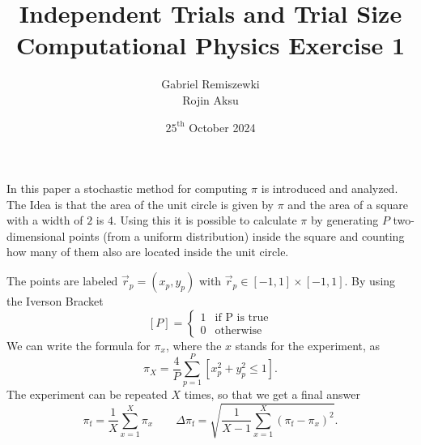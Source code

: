 \documentclass{article}
\author{Gabriel Remiszewki \\ Rojin Aksu}
\date{$25^{\mathrm{th}}$ October 2024}
\title{Independent Trials and Trial Size \\ \large Computational Physics Exercise 1}
\begin{document}
    \maketitle

    In this paper a stochastic method for computing $\pi$ is introduced and analyzed.
    The Idea is that the area of the unit circle is given by $\pi$ and the area of a square 
    with a width of $2$ is $4$. Using this it is possible to calculate $\pi$ by generating 
    $P$ two-dimensional points (from a uniform distribution) inside the square and counting how many of them also 
    are located inside the unit circle.\par
    The points are labeled $\vec r_p = (x_p, y_p)$ with $\vec r_p \in [-1, 1]\times [-1 ,1]$.
    By using the Iverson Bracket 
    \[
        [P] = \begin{cases}
           1 & \text{if P is true}\\
           0 & \mathrm{otherwise} 
        \end{cases}
    \]
    We can write the formula for $\pi_x$, where the $x$ stands for the experiment, as 
    \begin{equation}
        \pi_X = \frac{4}{P}\sum_{p = 1}^P [x_p^2 + y_p^2 \leq 1].
        \label{eq:pi} 
    \end{equation}
    The experiment can be repeated $X$ times, so that we get a final answer 
    \begin{equation}
        \pi_\mathrm f = \frac{1}{X}\sum_{x = 1}^X \pi_x \qquad 
        \Delta \pi_\mathrm f = \sqrt{\frac{1}{X-1}\sum_{x=1}^X (\pi_\mathrm f - \pi_x)^2}.
        \label{eq:pi_final}
    \end{equation}
    
\end{document}
